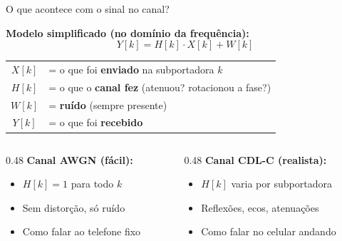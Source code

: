 \documentclass[aspectratio=169, 11pt]{beamer}
\begin{document}
\begin{frame}{O que acontece com o sinal no canal?}

    \textbf{Modelo simplificado (no domínio da frequência):}
    \begin{equation*}
        \boxed{Y[k] = H[k] \cdot X[k] + W[k]}
    \end{equation*}

    \pause
    \vspace{0.2cm}
    \begin{center}
    \begin{tabular}{cl}
        $X[k]$ & = o que foi \textbf{enviado} na subportadora $k$ \\
        $H[k]$ & = o que o \textbf{canal fez} (atenuou? rotacionou a fase?) \\
        $W[k]$ & = \textbf{ruído} (sempre presente) \\
        $Y[k]$ & = o que foi \textbf{recebido}
    \end{tabular}
    \end{center}

    \pause
    \vspace{0.3cm}
    \begin{columns}[T]
        \begin{column}{0.48\textwidth}
            \textbf{Canal AWGN (fácil):}
            \begin{itemize}
                \item $H[k] = 1$ para todo $k$
                \item Sem distorção, só ruído
                \item Como falar ao telefone fixo
            \end{itemize}
        \end{column}
        \begin{column}{0.48\textwidth}
            \textbf{Canal CDL-C (realista):}
            \begin{itemize}
                \item $H[k]$ varia por subportadora
                \item Reflexões, ecos, atenuações
                \item Como falar no celular andando
            \end{itemize}
        \end{column}
    \end{columns}
\end{frame}
\end{document}
